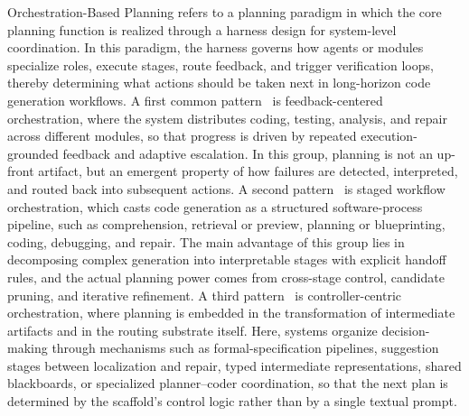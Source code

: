 \documentclass{llmxive}
\begin{document}
Orchestration-Based Planning refers to a planning paradigm in which the core planning function is realized through a harness design for system-level coordination. In this paradigm, the harness governs how agents or modules specialize roles, execute stages, route feedback, and trigger verification loops, thereby determining what actions should be taken next in long-horizon code generation workflows.
A first common pattern~\cite{huang2023agentcoder,ukai2024adacoder,Nunez2024AutoSafeCoder} is feedback-centered orchestration, where the system distributes coding, testing, analysis, and repair across different modules, so that progress is driven by repeated execution-grounded feedback and adaptive escalation. In this group, planning is not an up-front artifact, but an emergent property of how failures are detected, interpreted, and routed back into subsequent actions. A second pattern~\cite{islam2024mapcoder,Pan2025CodeCoR,mao2025blueprint2code} is staged workflow orchestration, which casts code generation as a structured software-process pipeline, such as comprehension, retrieval or preview, planning or blueprinting, coding, debugging, and repair. The main advantage of this group lies in decomposing complex generation into interpretable stages with explicit handoff rules, and the actual planning power comes from cross-stage control, candidate pruning, and iterative refinement. A third pattern~\cite{khan2025macog,doualgoforge,zhang2026sgagent,lu2025requirements} is controller-centric orchestration, where planning is embedded in the transformation of intermediate artifacts and in the routing substrate itself. Here, systems organize decision-making through mechanisms such as formal-specification pipelines, suggestion stages between localization and repair, typed intermediate representations, shared blackboards, or specialized planner–coder coordination, so that the next plan is determined by the scaffold’s control logic rather than by a single textual prompt.
\end{document}
